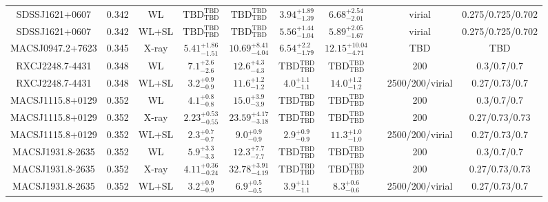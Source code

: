 \begin{table}
\begin{tabular}{cccccccccc}
SDSSJ1621+0607 & 0.342 & WL & ${\mathrm{TBD}}^{\mathrm{TBD}}_{\mathrm{TBD}}$ & ${\mathrm{TBD}}^{\mathrm{TBD}}_{\mathrm{TBD}}$ & ${3.94}^{+1.89}_{-1.39}$ & ${6.68}^{+2.54}_{-2.01}$ & \citet{OG12.1} & virial & 0.275/0.725/0.702 \\
SDSSJ1621+0607 & 0.342 & WL+SL & ${\mathrm{TBD}}^{\mathrm{TBD}}_{\mathrm{TBD}}$ & ${\mathrm{TBD}}^{\mathrm{TBD}}_{\mathrm{TBD}}$ & ${5.56}^{+1.44}_{-1.04}$ & ${5.89}^{+2.05}_{-1.67}$ & \citet{OG12.1} & virial & 0.275/0.725/0.702 \\
MACSJ0947.2+7623 & 0.345 & X-ray & ${5.41}^{+1.86}_{-1.51}$ & ${10.69}^{+8.41}_{-4.04}$ & ${6.54}^{+2.2}_{-1.79}$ & ${12.15}^{+10.04}_{-4.71}$ & \citet{SC06.1} & TBD & TBD \\
RXCJ2248.7-4431 & 0.348 & WL & ${7.1}^{+2.6}_{-2.6}$ & ${12.6}^{+4.3}_{-4.3}$ & ${\mathrm{TBD}}^{\mathrm{TBD}}_{\mathrm{TBD}}$ & ${\mathrm{TBD}}^{\mathrm{TBD}}_{\mathrm{TBD}}$ & \citet{SE14.1} & 200 & 0.3/0.7/0.7 \\
RXCJ2248.7-4431 & 0.348 & WL+SL & ${3.2}^{+0.9}_{-0.9}$ & ${11.6}^{+1.2}_{-1.2}$ & ${4.0}^{+1.1}_{-1.1}$ & ${14.0}^{+1.2}_{-1.2}$ & \citet{ME14.1} & 2500/200/virial & 0.27/0.73/0.7 \\
MACSJ1115.8+0129 & 0.352 & WL & ${4.1}^{+0.8}_{-0.8}$ & ${15.0}^{+3.9}_{-3.9}$ & ${\mathrm{TBD}}^{\mathrm{TBD}}_{\mathrm{TBD}}$ & ${\mathrm{TBD}}^{\mathrm{TBD}}_{\mathrm{TBD}}$ & \citet{SE14.1} & 200 & 0.3/0.7/0.7 \\
MACSJ1115.8+0129 & 0.352 & X-ray & ${2.23}^{+0.53}_{-0.55}$ & ${23.59}^{+4.17}_{-3.18}$ & ${\mathrm{TBD}}^{\mathrm{TBD}}_{\mathrm{TBD}}$ & ${\mathrm{TBD}}^{\mathrm{TBD}}_{\mathrm{TBD}}$ & \citet{BA14.1} & 200 & 0.27/0.73/0.73 \\
MACSJ1115.8+0129 & 0.352 & WL+SL & ${2.3}^{+0.7}_{-0.7}$ & ${9.0}^{+0.9}_{-0.9}$ & ${2.9}^{+0.9}_{-0.9}$ & ${11.3}^{+1.0}_{-1.0}$ & \citet{ME14.1} & 2500/200/virial & 0.27/0.73/0.7 \\
MACSJ1931.8-2635 & 0.352 & WL & ${5.9}^{+3.3}_{-3.3}$ & ${12.3}^{+7.7}_{-7.7}$ & ${\mathrm{TBD}}^{\mathrm{TBD}}_{\mathrm{TBD}}$ & ${\mathrm{TBD}}^{\mathrm{TBD}}_{\mathrm{TBD}}$ & \citet{SE14.1} & 200 & 0.3/0.7/0.7 \\
MACSJ1931.8-2635 & 0.352 & X-ray & ${4.11}^{+0.36}_{-0.24}$ & ${32.78}^{+3.91}_{-4.19}$ & ${\mathrm{TBD}}^{\mathrm{TBD}}_{\mathrm{TBD}}$ & ${\mathrm{TBD}}^{\mathrm{TBD}}_{\mathrm{TBD}}$ & \citet{BA14.1} & 200 & 0.27/0.73/0.73 \\
MACSJ1931.8-2635 & 0.352 & WL+SL & ${3.2}^{+0.9}_{-0.9}$ & ${6.9}^{+0.5}_{-0.5}$ & ${3.9}^{+1.1}_{-1.1}$ & ${8.3}^{+0.6}_{-0.6}$ & \citet{ME14.1} & 2500/200/virial & 0.27/0.73/0.7 \\

\end{tabular}
\end{table}
